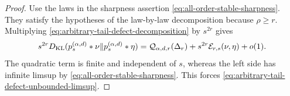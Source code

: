 \begin{proof}
Use the laws in the sharpness assertion
\eqref{eq:all-order-stable-sharpness}.  They satisfy the hypotheses of the
law-by-law decomposition because \(\rho\ge r\).  Multiplying
\eqref{eq:arbitrary-tail-defect-decomposition} by \(s^{2r}\) gives
\[
 s^{2r}D_{\rm KL}(p_s^{(\alpha,d)}*\nu\|p_s^{(\alpha,d)}*\eta)
 =\mathcal Q_{\alpha,d,r}(\Delta_r)
  +s^{2r}\mathcal E_{r,s}(\nu,\eta)+o(1).
\]
The quadratic term is finite and independent of \(s\), whereas the left
side has infinite limsup by \eqref{eq:all-order-stable-sharpness}.  This
forces \eqref{eq:arbitrary-tail-defect-unbounded-limsup}.
\end{proof}
